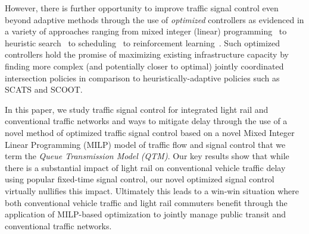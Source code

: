 However, there is further opportunity to improve traffic signal
control even beyond adaptive methods through the use of
\emph{optimized} controllers as evidenced in a variety of approaches
ranging from mixed integer (linear)
programming~
to heuristic search~ to
scheduling~ to reinforcement
learning~.  Such optimized
controllers hold the promise of maximizing existing infrastructure
capacity by finding more complex (and potentially closer to optimal)
jointly coordinated intersection policies in comparison to
heuristically-adaptive policies such as SCATS and SCOOT. 



In this paper, we study traffic signal control for integrated light
rail and conventional traffic networks and ways to mitigate delay
through the use of a novel method of optimized traffic signal control
based on a novel Mixed Integer Linear Programming (MILP) model of
traffic flow and signal control that we term the {\it Queue
  Transmission Model (QTM)}.  Our key results show that while there is
a substantial impact of light rail on conventional vehicle traffic
delay using popular fixed-time signal control, our novel optimized
signal control virtually nullifies this impact. Ultimately this leads
to a win-win situation where both conventional vehicle traffic and
light rail commuters benefit through the application of MILP-based
optimization to jointly manage public transit and conventional traffic
networks.




